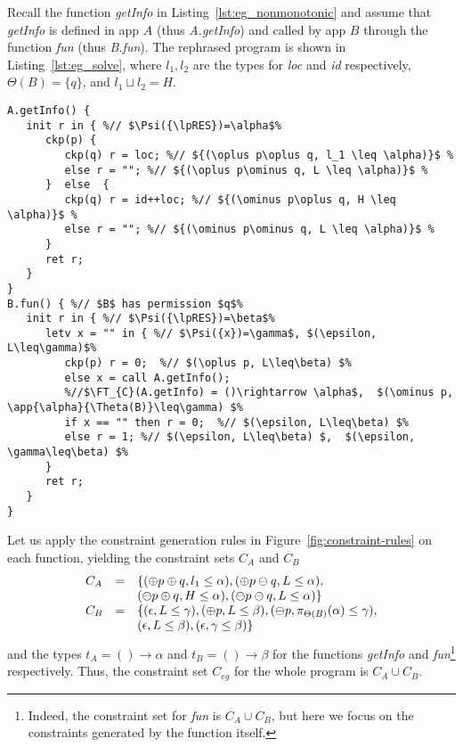 {{{Recall the function \textit{getInfo} in Listing~\ref{lst:eg_nonmonotonic} and assume that \textit{getInfo} is defined in app $A$ (thus \textit{A.getInfo}) and called by app $B$ through the function \textit{fun} (thus \textit{B.fun}). The rephrased program is shown in Listing~\ref{lst:eg_solve}, where $l_1, l_2$ are the types for \textit{loc}  and \textit{id} respectively, $\Theta(B) = \{q\}$, and $l_1\sqcup l_2 = H$.
\begin{lstlisting}[float=tp, caption={The example in Listing~\ref{lst:eg_nonmonotonic} in a calling context.}, label={lst:eg_solve}]
A.getInfo() {
   init r in { %// $\Psi({\lpRES})=\alpha$%
      ckp(p) {
         ckp(q) r = loc; %// ${(\oplus p\oplus q, l_1 \leq \alpha)}$ %
         else r = ""; %// ${(\oplus p\ominus q, L \leq \alpha)}$ %
      }  else  {
         ckp(q) r = id++loc; %// ${(\ominus p\oplus q, H \leq \alpha)}$ %
         else r = ""; %// ${(\ominus p\ominus q, L \leq \alpha)}$ %
      }
      ret r;   
   }
}
B.fun() { %// $B$ has permission $q$%
   init r in { %// $\Psi({\lpRES})=\beta$%
      letv x = "" in { %// $\Psi({x})=\gamma$, $(\epsilon, L\leq\gamma)$%
         ckp(p) r = 0;  %// $(\oplus p, L\leq\beta) $%
         else x = call A.getInfo();
         %//$\FT_{C}(A.getInfo) = ()\rightarrow \alpha$,  $(\ominus p, \app{\alpha}{\Theta(B)}\leq\gamma) $%
         if x == "" then r = 0;  %// $(\epsilon, L\leq\beta) $%
         else r = 1; %// $(\epsilon, L\leq\beta) $,  $(\epsilon, \gamma\leq\beta) $%
      }
      ret r;    
   }
}
\end{lstlisting}


Let us apply the constraint generation rules in Figure~\ref{fig:constraint-rules} on each function, yielding the constraint sets $C_A$ and $C_B$
{\myeqsize\[
\begin{array}{lcl}
C_A & =  &\{(\oplus p\oplus q, l_1 \leq \alpha),(\oplus p\ominus q, L \leq \alpha), \\
 & & (\ominus p\oplus q, H \leq \alpha), (\ominus p\ominus q, L \leq \alpha) \}\\
C_B & =  & \{(\epsilon, L\leq\gamma), (\oplus p, L\leq\beta) ,(\ominus p, \pi_{{\Theta(B)}}({\alpha})\leq\gamma), \\
& & (\epsilon, L\leq\beta),(\epsilon, \gamma\leq\beta)  \}
\end{array}
\]}
and the types $t_A =()\rightarrow \alpha$  and $t_B=()\rightarrow \beta$ for the functions  \textit{getInfo} and  \textit{fun}\footnote{Indeed, the constraint set for \textit{fun} is $C_A \cup C_B $, but here we focus on the constraints generated by the function itself.} respectively. Thus, the constraint set $C_{eg}$ for the whole program is $C_A \cup C_B$.

}}}
